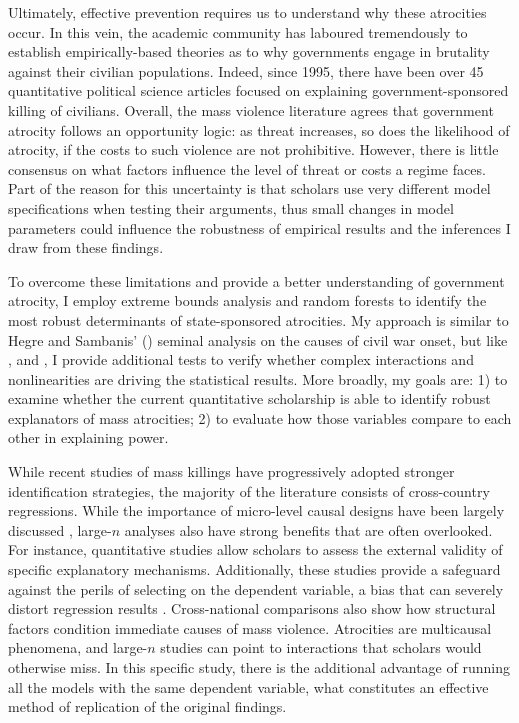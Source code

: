 Ultimately, effective prevention requires us to understand why these atrocities occur. In this vein, the academic community has laboured tremendously to establish empirically-based theories as to why governments engage in brutality against their civilian populations. Indeed, since 1995, there have been over 45 quantitative political science articles focused on explaining government-sponsored killing of civilians. Overall, the mass violence literature agrees that government atrocity follows an opportunity logic: as threat increases, so does the likelihood of atrocity, if the costs to such violence are not prohibitive. However, there is little consensus on what factors influence the level of threat or costs a regime faces. Part of the reason for this uncertainty is that scholars use very different model specifications when testing their arguments, thus small changes in model parameters could influence the robustness of empirical results and the inferences I draw from these findings.
	
To overcome these limitations and provide a better understanding of government atrocity, I employ extreme bounds analysis and random forests to identify the most robust determinants of state-sponsored atrocities. My approach is similar to Hegre and Sambanis' (\citeyear{hegre2006sensitivity}) seminal analysis on the causes of civil war onset, but like \citet{bell2015examining}, \citet{hill2014empirical} and \citet{jones2018there}, I provide additional tests to verify whether complex interactions and nonlinearities are driving the statistical results. More broadly, my goals are: 1) to examine whether the current quantitative scholarship is able to identify robust explanators of mass atrocities; 2) to evaluate how those variables compare to each other in explaining power. 

While recent studies of mass killings have progressively adopted stronger identification strategies, the majority of the literature consists of cross-country regressions. While the importance of micro-level causal designs have been largely discussed \citep[e.g.][]{angrist2008mostly,imbens2015causal}, large-$n$ analyses also have strong benefits that are often overlooked. For instance, quantitative studies allow scholars to assess the external validity of specific explanatory mechanisms. Additionally, these studies provide a safeguard against the perils of selecting on the dependent variable, a bias that can severely distort regression results \citep{bell2015examining,king1994designing}. Cross-national comparisons also show how structural factors condition immediate causes of mass violence. Atrocities are multicausal phenomena, and large-$n$ studies can point to interactions that scholars would otherwise miss. In this specific study, there is the additional advantage of running all the models with the same dependent variable, what constitutes an effective method of replication of the original findings.

